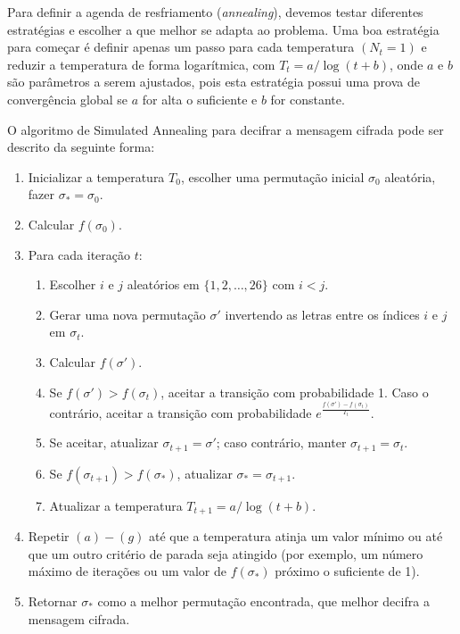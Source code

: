 \begin{resposta}
    Para definir a agenda de resfriamento (\textit{annealing}), devemos testar diferentes estratégias e escolher a que melhor se adapta ao problema. Uma boa estratégia para começar é definir apenas um passo para cada temperatura $(N_t=1)$ e reduzir a temperatura de forma logarítmica, com $T_t = a / \log(t+b)$, onde $a$ e $b$ são parâmetros a serem ajustados, pois esta estratégia possui uma prova de convergência global se $a$ for alta o suficiente e $b$ for constante.

    O algoritmo de Simulated Annealing para decifrar a mensagem cifrada pode ser descrito da seguinte forma:
    \begin{enumerate}
        \item Inicializar a temperatura $T_0$, escolher uma permutação inicial $\sigma_0$ aleatória, fazer $\sigma_* = \sigma_0$.
        \item Calcular $f(\sigma_0)$.
        \item Para cada iteração $t$:
            \begin{enumerate}
                \item Escolher $i$ e $j$ aleatórios em $\{1, 2, \ldots, 26\}$ com $i<j$.
                \item Gerar uma nova permutação $\sigma'$ invertendo as letras entre os índices $i$ e $j$ em $\sigma_t$.
                \item Calcular $f(\sigma')$.
                \item Se $f(\sigma') > f(\sigma_t)$, aceitar a transição com probabilidade 1. Caso o contrário, aceitar a transição com probabilidade $e^{\frac{f(\sigma')-f(\sigma_t)}{T_t}}$.
                \item Se aceitar, atualizar $\sigma_{t+1} = \sigma'$; caso contrário, manter $\sigma_{t+1} = \sigma_t$.
                \item Se $f(\sigma_{t+1}) > f(\sigma_*)$, atualizar $\sigma_* = \sigma_{t+1}$.
                \item Atualizar a temperatura $T_{t+1} = a / \log(t+b)$.
            \end{enumerate}
        \item Repetir $(a)-(g)$ até que a temperatura atinja um valor mínimo ou até que um outro critério de parada seja atingido (por exemplo, um número máximo de iterações ou um valor de $f(\sigma_*)$ próximo o suficiente de 1).
        \item Retornar $\sigma_*$ como a melhor permutação encontrada, que melhor decifra a mensagem cifrada.
    \end{enumerate}
\end{resposta}
